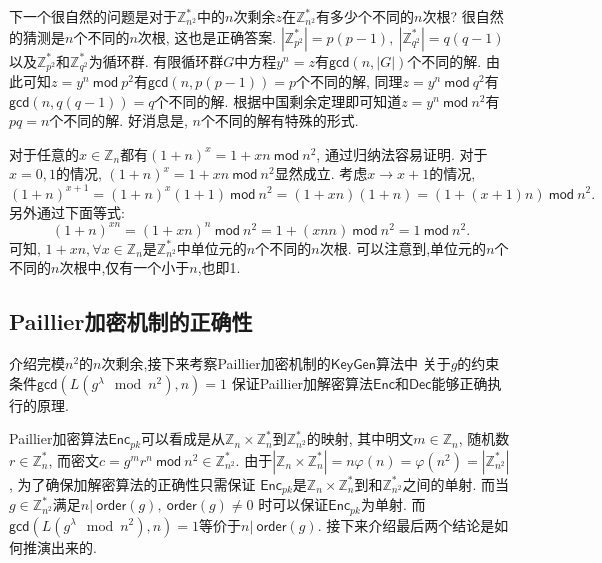 \documentclass{article}
\newcommand{\Z}{\mathbb{Z}}
\begin{document}
下一个很自然的问题是对于$\Z_{n^2}^*$中的$n$次剩余$z$在$\Z_{n^2}^*$有多少个不同的$n$次根?
很自然的猜测是$n$个不同的$n$次根, 这也是正确答案. 
$|\Z_{p^2}^*| = p(p-1),\ |\Z_{q^2}^*| = q(q-1)$以及$\Z_{p^2}^*$和$\Z_{q^2}^*$为循环群.
有限循环群$G$中方程$y^n = z$有$\textsf{gcd}(n, |G|)$个不同的解.
由此可知$z = y^n ~\textsf{mod}~p^2$有$\textsf{gcd}(n, p(p-1)) = p$个不同的解,
同理$z = y^n ~\textsf{mod}~q^2$有$\textsf{gcd}(n, q(q-1)) = q$个不同的解. 
根据中国剩余定理即可知道$z = y^n ~\textsf{mod}~ n^2$有$pq = n$个不同的解.
好消息是, $n$个不同的解有特殊的形式.

对于任意的$x\in\Z_n$都有$(1+n)^x = 1 + xn ~\textsf{mod}~n^2$, 
通过归纳法容易证明. 对于$x = 0, 1$的情况, $(1+n)^x = 1 + xn  ~\textsf{mod}~n^2$显然成立.
考虑$x \rightarrow x + 1$的情况,
$$
(1+n)^{x+1} = (1+n)^x(1+1) ~\textsf{mod}~ n^2 = (1 + xn)(1+n) = \left(1 + (x+1)n\right) ~\textsf{mod}~n^2.
$$
另外通过下面等式:
$$
(1+n)^{xn} = (1 + xn)^n ~\textsf{mod}~ n^2 = 1 + (xnn) ~\textsf{mod}~ n^2 = 1 ~\textsf{mod}~ n^2.
$$
可知, $1+xn, \forall x \in \Z_n$是$\Z_{n^2}^*$中单位元的$n$个不同的$n$次根.
可以注意到,单位元的$n$个不同的$n$次根中,仅有一个小于$n$,也即1.

\subsection{Paillier加密机制的正确性}

介绍完模$n^2$的$n$次剩余,接下来考察Paillier加密机制的$\textsf{KeyGen}$算法中
关于$g$的约束条件$\textsf{gcd}\left(L\left(g^\lambda \mod n^2\right), n\right) = 1$
保证Paillier加解密算法$\textsf{Enc}$和$\textsf{Dec}$能够正确执行的原理. 

Paillier加密算法$\textsf{Enc}_{pk}$可以看成是从$\Z_n\times\Z_n^*$到$\Z_{n^2}^*$的映射,
其中明文$m \in \Z_n$, 随机数$r\in\Z_n^*$, 而密文$c = g^mr^n~\textsf{mod}~n^2\in\Z_{n^2}^*$.
由于$|\Z_n\times\Z_n^*| = n\varphi(n) = \varphi(n^2) = |\Z_{n^2}^*|$, 
为了确保加解密算法的正确性只需保证
$\textsf{Enc}_{pk}$是$\Z_n\times\Z_n^*$到和$\Z_{n^2}^*$之间的单射.
而当$g\in\Z_{n^2}^*$满足$n | ~\textsf{order}(g), ~\textsf{order}(g) \neq 0$
时可以保证$\textsf{Enc}_{pk}$为单射.
而$\textsf{gcd}\left(L\left(g^\lambda \mod n^2\right), n\right) = 1$等价于$n | ~\textsf{order}(g)$.
接下来介绍最后两个结论是如何推演出来的.
\end{document}
